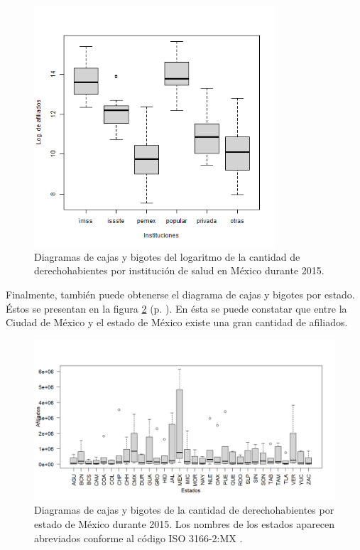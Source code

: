\documentclass[paper=leter, fontsize=11pt]{scrartcl}
\numberwithin{equation}{section}		%
\numberwithin{figure}{section}			%
\numberwithin{table}{section}				%
\begin{document}
\begin{figure}
    \centering
    \includegraphics[width=0.8\textwidth]{inst_log.png}
    \caption{Diagramas de cajas y bigotes del logaritmo de la cantidad de derechohabientes por institución de salud en México durante 2015.}
    \label{inst_log}
\end{figure}

Finalmente, también puede obtenerse el diagrama de cajas y bigotes por estado. Éstos se presentan en la figura \ref{estados} (p. \pageref{estados}). En ésta se puede constatar que entre la Ciudad de México y el estado de México existe una gran cantidad de afiliados.

\begin{figure}
    \centering
    \includegraphics[width=1\textwidth]{estados.png}
    \caption{Diagramas de cajas y bigotes de la cantidad de derechohabientes por estado de México durante 2015. Los nombres de los estados aparecen abreviados conforme al código ISO 3166-2:MX \cite{iso}.} 
    \label{estados}
\end{figure}



\end{document}
